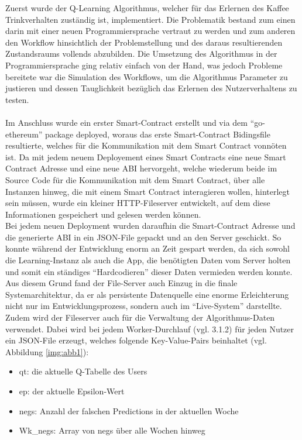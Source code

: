 Zuerst wurde der Q-Learning Algorithmus, welcher für das Erlernen des Kaffee Trinkverhalten zuständig ist, implementiert. Die Problematik bestand zum einen darin mit einer neuen Programmiersprache vertraut zu werden und zum anderen den Workflow hinsichtlich der Problemstellung und des daraus resultierenden Zustandsraums vollends abzubilden. Die Umsetzung des Algorithmus in der Programmiersprache ging relativ einfach von der Hand, was jedoch Probleme bereitete war die Simulation des Workflows, um die Algorithmus Parameter zu justieren und dessen Tauglichkeit bezüglich das Erlernen des Nutzerverhaltens zu testen.\\\\
Im Anschluss wurde ein erster Smart-Contract erstellt und via dem “go-ethereum” package deployed, woraus das erste Smart-Contract Bidingsfile resultierte, welches für die Kommunikation mit dem Smart Contract vonnöten ist. Da mit jedem neuem Deployement eines Smart Contracts eine neue Smart Contract Adresse und eine neue ABI hervorgeht, welche wiederum beide im Source Code für die Kommunikation mit dem Smart Contract, über alle Instanzen hinweg, die mit einem Smart Contract interagieren wollen, hinterlegt sein müssen, wurde ein kleiner HTTP-Fileserver entwickelt, auf dem diese Informationen gespeichert und gelesen werden können. \\
Bei jedem neuen Deployment wurden daraufhin die Smart-Contract Adresse und die generierte ABI in ein JSON-File gepackt und an den Server geschickt. So konnte während der Entwicklung enorm an Zeit gespart werden, da sich sowohl die Learning-Instanz als auch die App, die benötigten Daten vom Server holten und somit ein ständiges “Hardcodieren” dieser Daten vermieden werden konnte. \\
Aus diesem Grund fand der File-Server auch Einzug in die finale Systemarchitektur, da er als persistente Datenquelle eine enorme Erleichterung nicht nur im Entwicklungsprozess, sondern auch im “Live-System” darstellte. \\
Zudem wird der Fileserver auch für die Verwaltung der Algorithmus-Daten verwendet. Dabei wird bei jedem Worker-Durchlauf (vgl. 3.1.2) für jeden Nutzer ein JSON-File erzeugt, welches folgende Key-Value-Pairs beinhaltet (vgl. Abbildung \ref{img:abb1}): 
\begin{itemize}
	\item qt: die aktuelle Q-Tabelle des Users
	\item ep: der aktuelle Epsilon-Wert
	\item negs: Anzahl der falschen Predictions in der aktuellen Woche
	\item Wk\_negs: Array von negs über alle Wochen hinweg
\end{itemize}


